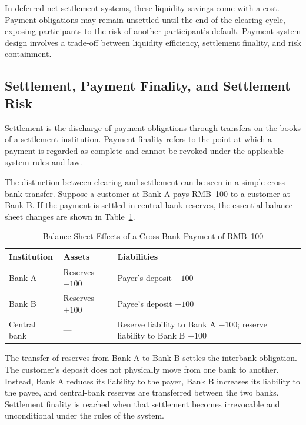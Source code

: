 In deferred net settlement systems, these liquidity savings come with a cost. Payment obligations may remain unsettled until the end of the clearing cycle, exposing participants to the risk of another participant's default. Payment-system design involves a trade-off between liquidity efficiency, settlement finality, and risk containment.

\subsection{Settlement, Payment Finality, and Settlement Risk}

Settlement is the discharge of payment obligations through transfers on the books of a settlement institution. Payment finality refers to the point at which a payment is regarded as complete and cannot be revoked under the applicable system rules and law.

The distinction between clearing and settlement can be seen in a simple cross-bank transfer. Suppose a customer at Bank A pays RMB~100 to a customer at Bank B. If the payment is settled in central-bank reserves, the essential balance-sheet changes are shown in Table~\ref{tab:ch2-cross-bank-payment}.

\begin{table}[H]
\centering
\caption{Balance-Sheet Effects of a Cross-Bank Payment of RMB~100}
\label{tab:ch2-cross-bank-payment}

\renewcommand{\arraystretch}{1.2}

\begin{tabularx}{\textwidth}{
    @{}
    >{\raggedright\arraybackslash}p{3.0cm}
    >{\raggedright\arraybackslash}X
    >{\raggedright\arraybackslash}X
    @{}
}
\toprule
\textbf{Institution}
& \textbf{Assets}
& \textbf{Liabilities} \\
\midrule

Bank A
& Reserves $-100$
& Payer's deposit $-100$ \\

Bank B
& Reserves $+100$
& Payee's deposit $+100$ \\

Central bank
& ---
& Reserve liability to Bank A $-100$; reserve liability to Bank B $+100$ \\

\bottomrule
\end{tabularx}
\end{table}

The transfer of reserves from Bank A to Bank B settles the interbank obligation. The customer's deposit does not physically move from one bank to another. Instead, Bank A reduces its liability to the payer, Bank B increases its liability to the payee, and central-bank reserves are transferred between the two banks. Settlement finality is reached when that settlement becomes irrevocable and unconditional under the rules of the system.

